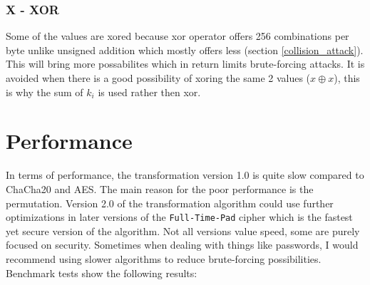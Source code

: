 \documentclass[fleqn, a4paper,12pt]{article}
\begin{document}
\subsubsection{X - XOR} %

Some of the values are xored because xor operator offers 256 combinations per byte unlike unsigned addition which mostly offers less (section \ref{collision_attack}). This will bring more possabilites which in return limits brute-forcing attacks. It is avoided when there is a good possibility of xoring the same 2 values ($x \oplus x$), this is why the sum of $k_i$ is used rather then xor.

\section{Performance}

In terms of performance, the transformation version 1.0 is quite slow compared to ChaCha20 and AES. The main reason for the poor performance is the permutation. Version 2.0 of the transformation algorithm could use further optimizations in later versions of the \texttt{Full-Time-Pad} cipher which is the fastest yet secure version of the algorithm. Not all versions value speed, some are purely focused on security. Sometimes when dealing with things like passwords, I would recommend using slower algorithms to reduce brute-forcing possibilities.\\

Benchmark tests show the following results: 
\end{document}
